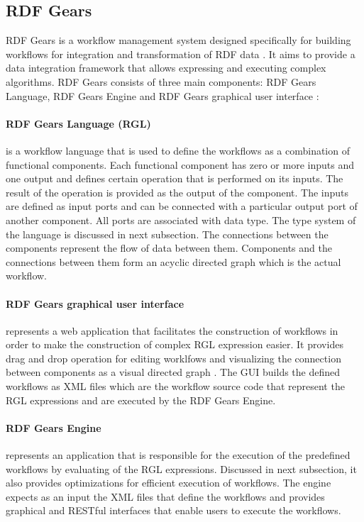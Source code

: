 \subsection{RDF Gears}
\label{sec:backRDFGears}

RDF Gears is a workflow management system designed specifically for building workflows for integration and transformation of RDF data \cite{feliksik2011}. It aims to provide a data integration framework that allows expressing and executing complex algorithms. RDF Gears consists of three main components: RDF Gears Language, RDF Gears Engine and RDF Gears graphical user interface \cite{feliksik2011}:

\paragraph{RDF Gears Language (RGL)} is a workflow language that is used to define the workflows as a combination of functional components. Each functional component has zero or more inputs and one output and defines certain operation that is performed on its inputs. The result of the operation is provided as the output of the component. The inputs are defined as input ports and can be connected with a particular output port of another component. All ports are associated with data type. The type system of the language is discussed in next subsection. The connections between the components represent the flow of data between them. Components and the connections between them form an acyclic directed graph which is the actual workflow. 

\paragraph{RDF Gears graphical user interface} represents a web application that facilitates the construction of workflows in order to make the construction of complex RGL expression easier. It provides drag and drop operation for editing worklfows and visualizing the connection between components as a visual directed graph \cite{maro2011}. The GUI builds the defined workflows as XML files which are the workflow source code that represent the RGL expressions and are executed by the RDF Gears Engine.

\paragraph{RDF Gears Engine} represents an application that is responsible for the execution of the predefined workflows by evaluating of the RGL expressions. Discussed in next subsection, it also provides optimizations for efficient execution of workflows. The engine expects as an input the XML files that define the workflows and provides graphical and RESTful interfaces that enable users to execute the workflows. 

